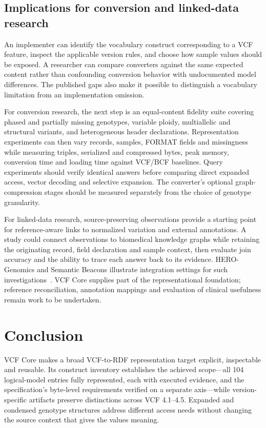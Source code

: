 \documentclass{ceurart}
\begin{document}
\subsection{Implications for conversion and linked-data research}

An implementer can identify the vocabulary construct corresponding to a VCF feature, inspect the applicable version rules, and choose how sample values should be exposed. A researcher can compare converters against the same expected content rather than confounding conversion behavior with undocumented model differences. The published gaps also make it possible to distinguish a vocabulary limitation from an implementation omission.

For conversion research, the next step is an equal-content fidelity suite covering phased and partially missing genotypes, variable ploidy, multiallelic and structural variants, and heterogeneous header declarations. Representation experiments can then vary records, samples, FORMAT fields and missingness while measuring triples, serialized and compressed bytes, peak memory, conversion time and loading time against VCF/BCF baselines. Query experiments should verify identical answers before comparing direct expanded access, vector decoding and selective expansion. The converter's optional graph-compression stages should be measured separately from the choice of genotype granularity.

For linked-data research, source-preserving observations provide a starting point for reference-aware links to normalized variation and external annotations. A study could connect observations to biomedical knowledge graphs while retaining the originating record, field declaration and sample context, then evaluate join accuracy and the ability to trace each answer back to its evidence. HERO-Genomics and Semantic Beacons illustrate integration settings for such investigations~\cite{cazzaro2025hero,bodrug2025semantic}. VCF Core supplies part of the representational foundation; reference reconciliation, annotation mappings and evaluation of clinical usefulness remain work to be undertaken.

\section{Conclusion}

VCF Core makes a broad VCF-to-RDF representation target explicit, inspectable and reusable. Its construct inventory establishes the achieved scope---all 104 logical-model entries fully represented, each with executed evidence, and the specification's byte-level requirements verified on a separate axis---while version-specific artifacts preserve distinctions across VCF 4.1--4.5. Expanded and condensed genotype structures address different access needs without changing the source context that gives the values meaning.
\end{document}
